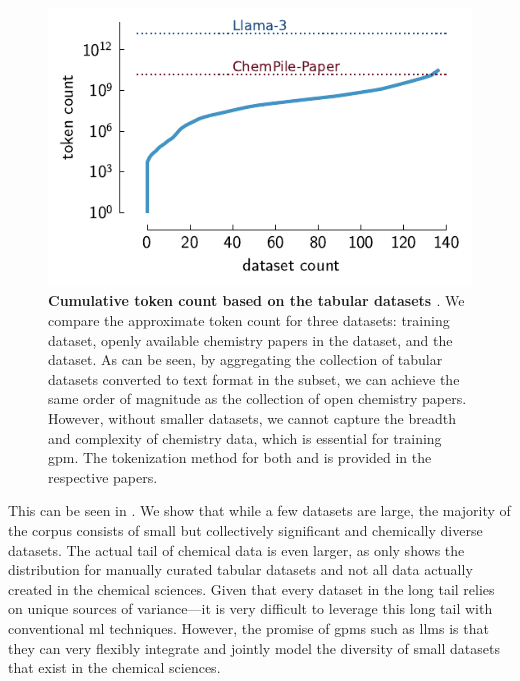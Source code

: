 \begin{figure}[ht]
    \centering
    \includegraphics{figures/final_figures/2_DATA_cumulative_histogram.pdf}
    \caption{\textbf{Cumulative token count based on the  tabular datasets \autocite{mirza2025chempile0}}. We compare the approximate token count for three datasets:  training dataset,\autocite{grattafiori2024llama} openly available chemistry papers in the  dataset, and the  dataset. As can be seen, by aggregating the collection of tabular datasets converted to text format in the  subset, we can achieve the same order of magnitude as the collection of open chemistry papers. However, without smaller datasets, we cannot capture the breadth and complexity of chemistry data, which is essential for training \gls{gpm}. The tokenization method for both  and  is provided in the respective papers.}
    \label{fig:scale_of_data}
\end{figure}

This can be seen in . We show that while a few datasets are large, the majority of the corpus consists of small but collectively significant and chemically diverse datasets.
The actual tail of chemical data is even larger, as  only shows the distribution for manually curated tabular datasets and not all data actually created in the chemical sciences.
Given that every dataset in the long tail relies on unique sources of variance---it is very difficult to leverage this long tail with conventional \gls{ml} techniques. However, the promise of \glspl{gpm} such as \glspl{llm} is that they can very flexibly integrate and jointly model the diversity of small datasets that exist in the chemical sciences.

